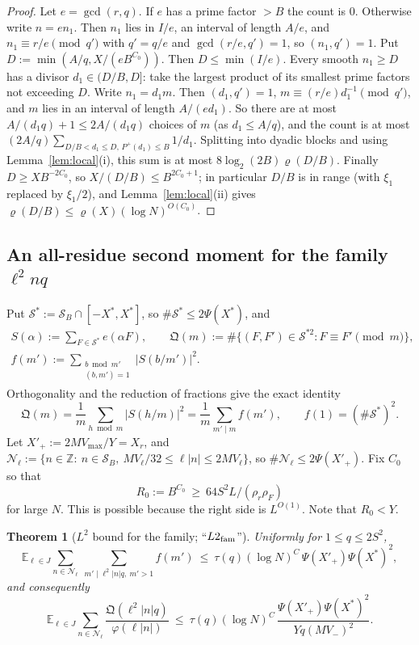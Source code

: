 \documentclass[11pt]{amsart}
\newtheorem{theorem}{Theorem}[section]
\theoremstyle{definition}
\newcommand{\Z}{\mathbb{Z}}
\newcommand{\cN}{\mathcal{N}}
\newcommand{\cS}{\mathcal{S}}
\newcommand{\fQ}{\mathfrak{Q}}
\newcommand{\Vm}{V_{-}}
\newcommand{\VM}{V_{\max}}
\newcommand{\Xr}{X_{r}}
\newcommand{\XF}{X^{*}}
\newcommand{\rr}{\rho_r}
\newcommand{\rF}{\rho_F}
\newcommand{\Ex}{\mathbb{E}}
\newcommand{\Pp}{P^{+}}
\begin{document}
\begin{proof}
Let $e=\gcd(r,q)$. If $e$ has a prime factor $>B$ the count is $0$. Otherwise write $n=en_1$. Then $n_1$ lies in $I/e$, an interval of
length $A/e$, and $n_1\equiv r/e\pmod{q'}$ with $q'=q/e$ and $\gcd(r/e,q')=1$, so $(n_1,q')=1$. Put $D:=\min(A/q,X/(eB^{C_0}))$. Then
$D\le\min(I/e)$. Every smooth $n_1\ge D$ has a divisor $d_1\in(D/B,D]$: take the largest product of its smallest prime factors not
exceeding $D$. Write $n_1=d_1m$. Then $(d_1,q')=1$, $m\equiv(r/e)d_1^{-1}\pmod{q'}$, and $m$ lies in an interval of length
$A/(ed_1)$. So there are at most $A/(d_1q)+1\le2A/(d_1q)$ choices of $m$ (as $d_1\le A/q$), and the count is at most
$(2A/q)\sum_{D/B<d_1\le D,\,\Pp(d_1)\le B}1/d_1$. Splitting into dyadic blocks and using Lemma~\ref{lem:local}(i), this sum is at most
$8\log_2(2B)\varrho(D/B)$. Finally $D\ge XB^{-2C_0}$, so $X/(D/B)\le B^{2C_0+1}$; in particular $D/B$ is in range (with $\xi_1$ replaced by $\xi_1/2$), and Lemma~\ref{lem:local}(ii) gives
$\varrho(D/B)\le\varrho(X)(\log N)^{O(C_0)}$.
\end{proof}

\subsection{An all-residue second moment for the family \texorpdfstring{$\ell^2nq$}{l\^{}2nq}}

Put $\cS^*:=\cS_B\cap[-\XF,\XF]$, so $\#\cS^*\le2\Psi(\XF)$, and
\begin{gather*}
S(\alpha):=\sum_{F\in\cS^*}e(\alpha F),\qquad\fQ(m):=\#\{(F,F')\in\cS^{*2}:F\equiv F'\pmod m\},\\
f(m'):=\sum_{\substack{b\bmod m'\\(b,m')=1}}|S(b/m')|^2.
\end{gather*}
Orthogonality and the reduction of fractions give the exact identity
\begin{equation}\label{eq:parseval}
\fQ(m)=\frac1m\sum_{h\bmod m}|S(h/m)|^2=\frac1m\sum_{m'\mid m}f(m'),\qquad f(1)=(\#\cS^*)^2.
\end{equation}
Let $X'_+:=2M\VM/Y=\Xr$, and $\cN_\ell:=\{n\in\Z:\ n\in\cS_B,\ MV_\ell/32\le\ell|n|\le2MV_\ell\}$, so $\#\cN_\ell\le2\Psi(X'_+)$. Fix $C_0$ so that
\[
R_0:=B^{C_0}\ \ge\ 64S^2L/(\rr\rF)
\]
for large $N$. This is possible because the right side is $L^{O(1)}$. Note that $R_0<Y$.

\begin{theorem}[$L^2$ bound for the family; ``$L2_{\rm fam}$'']\label{thm:L2}
Uniformly for $1\le q\le2S^2$,
\begin{equation}\label{eq:L2a}
\Ex_{\ell\in J}\sum_{n\in\cN_\ell}\ \sum_{m'\mid\ell^2|n|q,\ m'>1}f(m')\ \le\ \tau(q)(\log N)^{C}\,\Psi(X'_+)\Psi(\XF)^2,
\end{equation}
and consequently
\begin{equation}\label{eq:L2b}
\Ex_{\ell\in J}\sum_{n\in\cN_\ell}\frac{\fQ(\ell^2|n|q)}{\varphi(\ell|n|)}\ \le\ \tau(q)(\log N)^{C}\,\frac{\Psi(X'_+)\Psi(\XF)^2}{Yq(M\Vm)^2}.
\end{equation}
\end{theorem}
\end{document}
